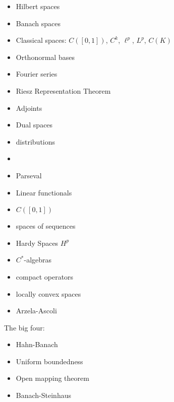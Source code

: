 \documentclass[margin]{res}
\theoremstyle{plain}
\theoremstyle{definition}
\theoremstyle{remark}
\begin{document}
\begin{resume}
\begin{itemize}
 \item Hilbert spaces
 \item Banach spaces
 \item Classical spaces: $C([0,1])$, $C^k$, $\ell^p$, $L^p$, $C(K)$
 \item Orthonormal bases
 \item Fourier series
 \item Riesz Representation Theorem
 \item Adjoints
 \item Dual spaces
 \item distributions
 \item 
 \item Parseval
 \item Linear functionals
 \item $C([0,1])$
 \item spaces of sequences
 \item Hardy Spaces $H^p$
 \item $C^*$-algebras
 \item compact operators
 \item locally convex spaces
 \item Arzela-Ascoli
\end{itemize}
The big four:
\begin{itemize}
 \item Hahn-Banach
 \item Uniform boundedness
 \item Open mapping theorem
 \item Banach-Steinhaus
\end{itemize}







\end{resume}
\end{document}
